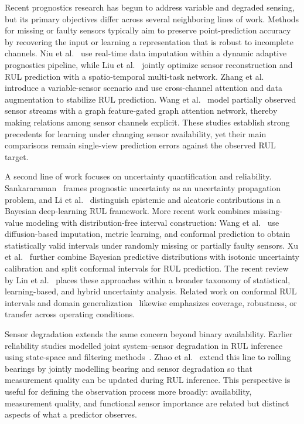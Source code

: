 Recent prognostics research has begun to address variable and degraded sensing, but
its primary objectives differ across several neighboring lines of work. Methods for
missing or faulty sensors typically aim to preserve point-prediction accuracy by
recovering the input or learning a representation that is robust to incomplete
channels. Niu et al.~\citep{niu2026dynamic} use real-time data imputation within a
dynamic adaptive prognostics pipeline, while Liu et al.~\citep{liu2026strsmtnet}
jointly optimize sensor reconstruction and RUL prediction with a spatio-temporal
multi-task network. Zhang et al.~\citep{zhang2025msccan} introduce a variable-sensor
scenario and use cross-channel attention and data augmentation to stabilize RUL
prediction. Wang et al.~\citep{wang2025gfggat} model partially observed sensor
streams with a graph feature-gated graph attention network,
thereby making relations among sensor channels explicit. These studies establish
strong precedents for learning under changing sensor availability, yet their main
comparisons remain single-view prediction errors against the observed RUL target.

A second line of work focuses on uncertainty quantification and reliability. Sankararaman~\citep{sankararaman201501405029} frames prognostic uncertainty as an uncertainty
propagation problem, and Li et al.~\citep{li202103009593} distinguish epistemic and
aleatoric contributions in a Bayesian deep-learning RUL framework. More recent work
combines missing-value modeling with distribution-free interval construction:
Wang et al.~\citep{wang2025robustuq} use diffusion-based imputation, metric learning,
and conformal prediction to obtain statistically valid intervals under randomly
missing or partially faulty sensors. Xu et al.~\citep{xu2026calibratedrul} further
combine Bayesian predictive distributions with isotonic uncertainty calibration and
split conformal intervals for RUL prediction. The recent review by Lin et al.~\citep{lin2026uncertaintyreview}
places these approaches within a broader taxonomy of statistical, learning-based,
and hybrid uncertainty analysis. Related work on conformal RUL intervals and domain
generalization~\citep{javanmardi202314i23417,xu202310381131,ding202322110199,tong202443366689}
likewise emphasizes coverage, robustness, or transfer across operating conditions.

Sensor degradation extends the same concern beyond binary availability. Earlier
reliability studies modelled joint system--sensor degradation in RUL inference using
state-space and filtering methods~\citep{mukhopadhyay2023degradingsensors,hachem2024sensordegradation}.
Zhao et al.~\citep{zhao2026sensordegradation} extend this line to rolling bearings by
jointly modelling bearing and sensor degradation so that measurement quality can be
updated during RUL inference. This perspective is useful for defining the observation
process more broadly: availability, measurement quality, and functional sensor
importance are related but distinct aspects of what a predictor observes.

